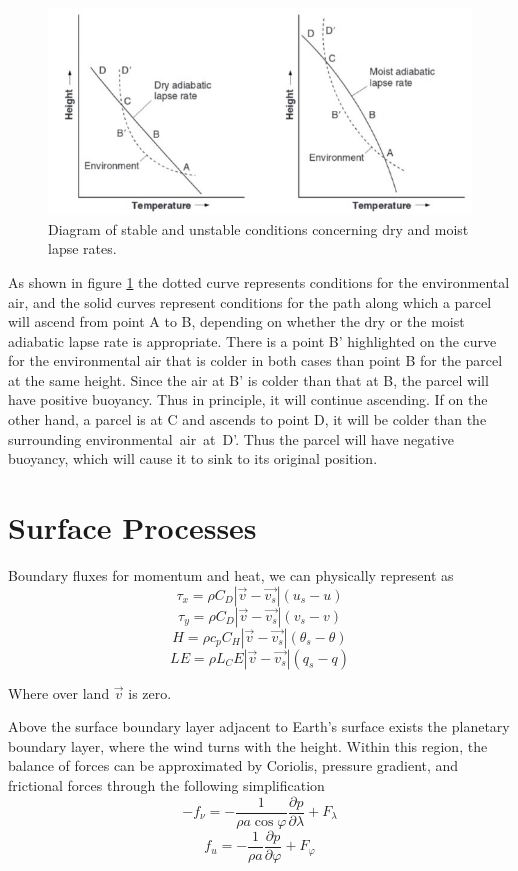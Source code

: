 \begin{figure}[h!]
	\centering
	\includegraphics[width=0.5\linewidth]{uploads/image15.png}
	\caption{Diagram of stable and unstable conditions concerning dry and moist lapse rates.}
	\label{fig: figure 15}
\end{figure}
As shown in figure \ref{fig: figure 15} the dotted curve represents conditions for the environmental air, and the solid curves represent conditions for the path along which a parcel will ascend from point A to B, depending on whether the dry or the moist adiabatic lapse rate is appropriate. There is a point B' highlighted on the curve for the environmental air that is colder in both cases than point B for the parcel at the same height. Since the air at B' is colder than that at B, the parcel will have positive buoyancy. Thus in principle, it will continue ascending. If on the other hand, a parcel is at C and ascends to point D, it will be colder than the surrounding environmental air at D'. Thus the parcel will have negative buoyancy, which will cause it to sink to its original position.

\section{Surface Processes}
Boundary fluxes for momentum and heat, we can physically represent as
$$\tau_x = \rho C_D \left| \vec{v} - \vec{v_s} \right| (u_s - u)$$
$$\tau_y = \rho C_D \left| \vec{v} - \vec{v_s} \right| (v_s - v)$$
$$H = \rho c_p C_H \left| \vec{v} - \vec{v_s} \right| (\theta_s - \theta)$$
$$LE = \rho L_C E \left| \vec{v} - \vec{v_s} \right| (q_s - q)$$

Where over land $\vec{v}$ is zero.

Above the surface boundary layer adjacent to Earth's surface exists the planetary boundary layer, where the wind turns with the height. Within this region, the balance of forces can be approximated by Coriolis, pressure gradient, and frictional forces through the following simplification
$$-f_{\nu} = - \frac{1}{\rho a \cos \varphi} \frac{\partial p}{\partial \lambda} + F_{\lambda}$$
$$f_u = - \frac{1}{\rho a} \frac{\partial p}{\partial \varphi} + F_{\varphi}$$

